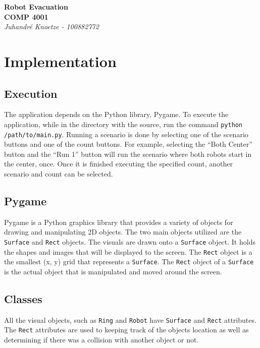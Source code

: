 \documentclass[12pt,letterpaper]{article}
\begin{document}
    \begin{titlepage}
        \begin{center}
            \LARGE\textbf{Robot Evacuation} \\
            \Large\textbf{COMP 4001} \\
            \large\textit{Juhandr\'{e} Knoetze - 100882772}
        \end{center}
    \end{titlepage}

    \newpage
    \tableofcontents{}
    \newpage
    
    \section{Implementation}
    \subsection{Execution}
        The application depends on the Python library, Pygame. To execute the application, while in the directory with the source, run the command \texttt{python /path/to/main.py}. Running a scenario is done by selecting one of the scenario buttons and one of the count buttons. For example, selecting the ``Both Center'' button and the ``Run 1'' button will run the scenario where both robots start in the center, once. Once it is finished executing the specified count, another scenario and count can be selected.
        
    \subsection{Pygame}
        Pygame is a Python graphics library that provides a variety of objects for drawing and manipulating 2D objects. The two main objects utilized are the \texttt{Surface} and \texttt{Rect} objects. The visuals are drawn onto a \texttt{Surface} object. It holds the shapes and images that will be displayed to the screen. The \texttt{Rect} object is a the smallest (x, y) grid that represents a \texttt{Surface}. The \texttt{Rect} object of a \texttt{Surface} is the actual object that is manipulated and moved around the screen.
    
    \subsection{Classes}
        All the visual objects, such as \texttt{Ring} and \texttt{Robot} have \texttt{Surface} and \texttt{Rect} attributes. The \texttt{Rect} attributes are used to keeping track of the objects location as well as determining if there was a collision with another object or not.
    
\end{document}
